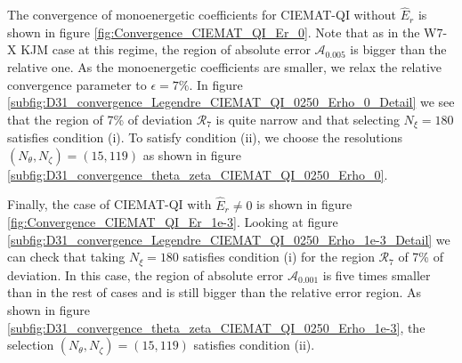 The convergence of monoenergetic coefficients for CIEMAT-QI without $\widehat{E}_r$ is shown in figure \ref{fig:Convergence_CIEMAT_QI_Er_0}. Note that as in the W7-X KJM case at this regime, the region of absolute error $\mathcal{A}_{0.005}$ is bigger than the relative one. As the monoenergetic coefficients are smaller, we relax the relative convergence parameter to $\epsilon=7\%$. In figure \ref{subfig:D31_convergence_Legendre_CIEMAT_QI_0250_Erho_0_Detail} we see that the region of 7\% of deviation $\mathcal{R}_{7}$ is quite narrow and that selecting $N_\xi=180$ satisfies condition (i). To satisfy condition (ii), we choose the resolutions $(N_\theta,N_\zeta)=(15,119)$ as shown in figure \ref{subfig:D31_convergence_theta_zeta_CIEMAT_QI_0250_Erho_0}. 



Finally, the case of CIEMAT-QI with $\widehat{E}_r\ne 0$ is shown in figure \ref{fig:Convergence_CIEMAT_QI_Er_1e-3}. Looking at figure \ref{subfig:D31_convergence_Legendre_CIEMAT_QI_0250_Erho_1e-3_Detail} we can check that taking $N_\xi=180$ satisfies condition (i) for the region $\mathcal{R}_7$ of 7\% of deviation. In this case, the region of absolute error $\mathcal{A}_{0.001}$ is five times smaller than in the rest of cases and is still bigger than the relative error region. As shown in figure \ref{subfig:D31_convergence_theta_zeta_CIEMAT_QI_0250_Erho_1e-3}, the selection $(N_\theta,N_\zeta)=(15,119)$ satisfies condition (ii).










